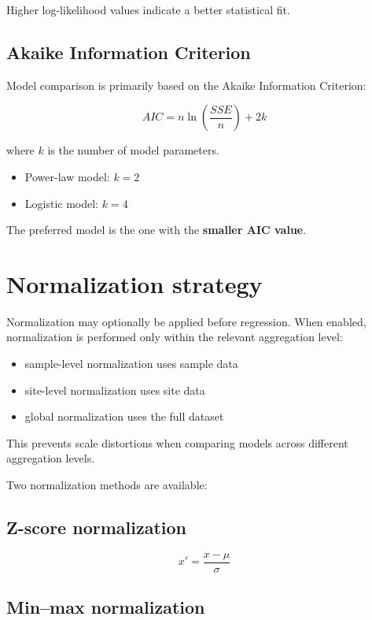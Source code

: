 \documentclass[11pt]{article}
\begin{document}
Higher log-likelihood values indicate a better statistical fit.

\subsection{Akaike Information Criterion}

Model comparison is primarily based on the Akaike Information Criterion:

\[
AIC = n\ln\left(\frac{SSE}{n}\right) + 2k
\]

where $k$ is the number of model parameters.

\begin{itemize}

\item Power-law model: $k=2$
\item Logistic model: $k=4$

\end{itemize}

The preferred model is the one with the \textbf{smaller AIC value}.

\section{Normalization strategy}

Normalization may optionally be applied before regression. When enabled, normalization is performed only within the relevant aggregation level:

\begin{itemize}

\item sample-level normalization uses sample data
\item site-level normalization uses site data
\item global normalization uses the full dataset

\end{itemize}

This prevents scale distortions when comparing models across different aggregation levels.

Two normalization methods are available:

\subsection{Z-score normalization}

\[
x' = \frac{x-\mu}{\sigma}
\]

\subsection{Min–max normalization}
\end{document}
